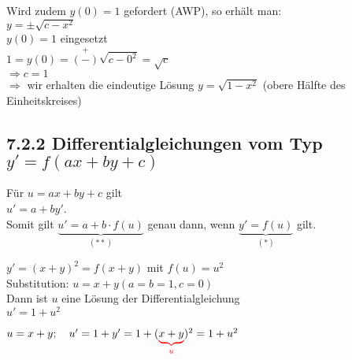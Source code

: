 Wird zudem $y(0)=1$ gefordert (AWP), so erhält man:\\
\hhspace{2cm}$y=\pm\sqrt{c-x^2}$\\
$y(0)=1$ eingesetzt\\
\hhspace{2cm}$1=y(0)=\stackrel{+}{(-)}\sqrt{c-0^2}=\sqrt{c}$\\
$\Rightarrow c=1$\\
$\Rightarrow$ wir erhalten die eindeutige Lösung $y=\sqrt{1-x^2}$ (obere Hälfte des Einheitskreises)

\subsection{7.2.2 Differentialgleichungen vom Typ $y'=f(ax+by+c)$}

\Beweis Für $u=ax+by+c$ gilt\\
$u'=a+by'$.\\
Somit gilt $\underbrace{u'=a+b\cdot f(u)}_{(**)}$ genau dann, wenn $\underbrace{y'=f(u)}_{(*)}$ gilt.

\Bsp $y'=(x+y)^2$\quad$=f(x+y)$ mit $f(u)=u^2$\\
Substitution: $u=x+y$\quad$(a=b=1, c=0)$\\
Dann ist $u$ eine Lösung der Differentialgleichung\\
\hhspace{2cm}$u'=1+u^2$

$u=x+y;\quad u'=1+y'=1+(\redunderbrace{x+y}{u})^2=1+u^2$

